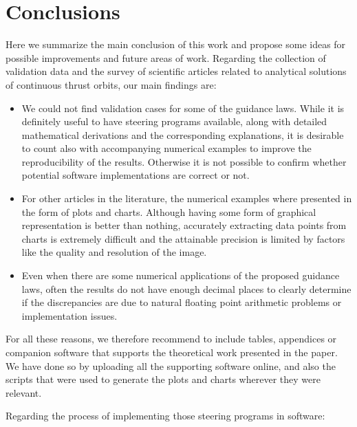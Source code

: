 \chapter{Conclusions} \label{sec:conclusions}

Here we summarize the main conclusion of this work and propose some ideas for possible improvements and future areas of work. Regarding the collection of validation data and the survey of scientific articles related to analytical solutions of continuous thrust orbits, our main findings are:

\begin{itemize}
\item We could not find validation cases for some of the guidance laws. While it is definitely useful to have steering programs available, along with detailed mathematical derivations and the corresponding explanations, it is desirable to count also with accompanying numerical examples to improve the reproducibility of the results. Otherwise it is not possible to confirm whether potential software implementations are correct or not.
%
\item For other articles in the literature, the numerical examples where presented in the form of plots and charts. Although having some form of graphical representation is better than nothing, accurately extracting data points from charts is extremely difficult and the attainable precision is limited by factors like the quality and resolution of the image.
%
\item Even when there are some numerical applications of the proposed guidance laws, often the results do not have enough decimal places to clearly determine if the discrepancies are due to natural floating point arithmetic problems or implementation issues.
\end{itemize}

For all these reasons, we therefore recommend to include tables, appendices or companion software that supports the theoretical work presented in the paper. We have done so by uploading all the supporting software online, and also the scripts that were used to generate the plots and charts wherever they were relevant.

Regarding the process of implementing those steering programs in software:

